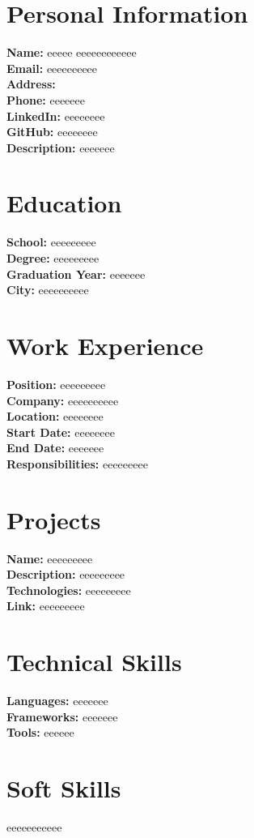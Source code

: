 \documentclass{article}
\begin{document}
\section*{Personal Information}
\textbf{Name:} eeeee eeeeeeeeeeee \\
\textbf{Email:} eeeeeeeeee \\
\textbf{Address:}  \\
\textbf{Phone:} eeeeeee \\
\textbf{LinkedIn:} eeeeeeee \\
\textbf{GitHub:} eeeeeeee \\
\textbf{Description:} eeeeeee \\

\section*{Education}

\textbf{School:} eeeeeeeee \\
\textbf{Degree:} eeeeeeeee \\
\textbf{Graduation Year:} eeeeeee \\
\textbf{City:} eeeeeeeeee \\


\section*{Work Experience}

\textbf{Position:} eeeeeeeee \\
\textbf{Company:} eeeeeeeeee \\
\textbf{Location:} eeeeeeee \\
\textbf{Start Date:} eeeeeeee \\
\textbf{End Date:} eeeeeee \\
\textbf{Responsibilities:} eeeeeeeee \\


\section*{Projects}

\textbf{Name:} eeeeeeeee \\
\textbf{Description:} eeeeeeeee \\
\textbf{Technologies:} eeeeeeeee \\
\textbf{Link:} eeeeeeeee \\


\section*{Technical Skills}
\textbf{Languages:} eeeeeee \\
\textbf{Frameworks:} eeeeeee \\
\textbf{Tools:} eeeeee \\

\section*{Soft Skills}
eeeeeeeeeee
\end{document}
